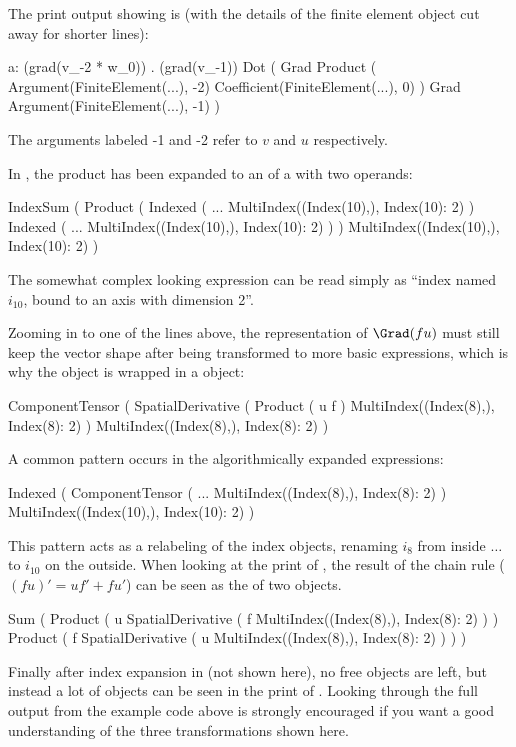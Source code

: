 The print output showing  is (with the details of the finite
element object cut away for shorter lines):
\begin{progoutput}
a:  (grad(v_{-2} * w_0)) . (grad(v_{-1}))
Dot
(
    Grad
        Product
        (
            Argument(FiniteElement(...), -2)
            Coefficient(FiniteElement(...), 0)
        )
    Grad
        Argument(FiniteElement(...), -1)
)
\end{progoutput}
The arguments labeled -1 and -2 refer to $v$ and $u$ respectively.

In , the  product has been expanded to an 
of a  with two  operands:
\begin{progoutput}
IndexSum
(
    Product
    (
        Indexed
        (
            ...
            MultiIndex((Index(10),), {Index(10): 2})
        )
        Indexed
        (
            ...
            MultiIndex((Index(10),), {Index(10): 2})
        )
    )
    MultiIndex((Index(10),), {Index(10): 2})
)
\end{progoutput}
The somewhat complex looking expression  can be read simply as ``index named $i_{10}$, bound
to an axis with dimension 2''.

Zooming in to one of the  lines above, the representation of
$\Grad(fu)$ must still keep the vector shape after being transformed
to more basic expressions, which is why the 
object is wrapped in a  object:
\begin{progoutput}
ComponentTensor
(
    SpatialDerivative
    (
        Product
        (
            u
            f
        )
        MultiIndex((Index(8),), {Index(8): 2})
    )
    MultiIndex((Index(8),), {Index(8): 2})
)
\end{progoutput}
A common pattern occurs in the algorithmically expanded expressions:
\begin{progoutput}
Indexed
(
    ComponentTensor
    (
        ...
        MultiIndex((Index(8),), {Index(8): 2})
    )
    MultiIndex((Index(10),), {Index(10): 2})
)
\end{progoutput}
This pattern acts as a relabeling of the index objects, renaming $i_{8}$
from inside $\ldots$ to $i_{10}$ on the outside.  When looking at the
print of , the result of the chain rule ($(fu)' = u f' + f u'$)
can be seen as the  of two  objects.
\begin{progoutput}
Sum
(
    Product
    (
        u
        SpatialDerivative
        (
            f
            MultiIndex((Index(8),), {Index(8): 2})
        )
    )
    Product
    (
        f
        SpatialDerivative
        (
            u
            MultiIndex((Index(8),), {Index(8): 2})
        )
    )
)
\end{progoutput}
Finally after index expansion in  (not shown here), no free
 objects are left, but instead a lot of 
objects can be seen in the print of . Looking through the full
output from the example code above is strongly encouraged if you want
a good understanding of the three transformations shown here.

